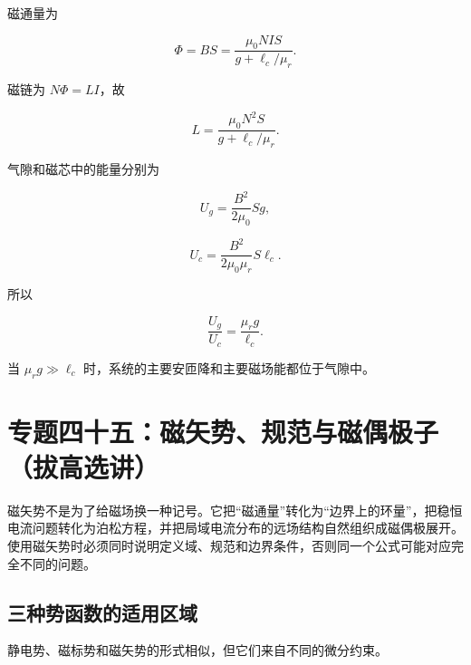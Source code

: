 磁通量为

\[
\boxed{
\Phi=BS
=\frac{\mu_0NIS}{g+\ell_c/\mu_r}
}.
\]

磁链为 \(N\Phi=LI\)，故

\[
\boxed{
L=\frac{\mu_0N^2S}{g+\ell_c/\mu_r}
}.
\]

气隙和磁芯中的能量分别为

\[
U_g=\frac{B^2}{2\mu_0}Sg,
\]

\[
U_c=\frac{B^2}{2\mu_0\mu_r}S\ell_c.
\]

所以

\[
\boxed{
\frac{U_g}{U_c}=\frac{\mu_rg}{\ell_c}
}.
\]

当 \(\mu_rg\gg\ell_c\) 时，系统的主要安匝降和主要磁场能都位于气隙中。

\section{专题四十五：磁矢势、规范与磁偶极子（拔高选讲）}\label{m5:ux4e13ux9898ux56dbux5341ux4e94ux78c1ux77e2ux52bfux89c4ux8303ux4e0eux78c1ux5076ux6781ux5b50ux62d4ux9ad8ux9009ux8bb2}

磁矢势不是为了给磁场换一种记号。它把``磁通量''转化为``边界上的环量''，把稳恒电流问题转化为泊松方程，并把局域电流分布的远场结构自然组织成磁偶极展开。使用磁矢势时必须同时说明定义域、规范和边界条件，否则同一个公式可能对应完全不同的问题。

\subsection{三种势函数的适用区域}\label{m5:ux4e09ux79cdux52bfux51fdux6570ux7684ux9002ux7528ux533aux57df}

静电势、磁标势和磁矢势的形式相似，但它们来自不同的微分约束。

